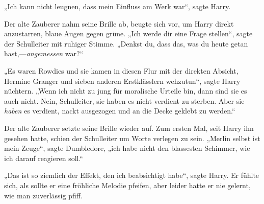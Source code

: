 „Ich kann nicht leugnen, dass mein Einfluss am Werk war“, sagte Harry.

Der alte Zauberer nahm seine Brille ab, beugte sich vor, um Harry direkt anzustarren, blaue Augen gegen grüne. „Ich werde dir eine Frage stellen“, sagte der Schulleiter mit ruhiger Stimme. „Denkst du, dass das, was du heute getan hast,—\emph{angemessen} war?“

„Es waren Rowdies und sie kamen in diesen Flur mit der direkten Absicht, Hermine Granger und sieben anderen Erstklässlern wehzutun“, sagte Harry nüchtern. „Wenn ich nicht zu jung für moralische Urteile bin, dann sind sie es auch nicht. Nein, Schulleiter, sie haben es nicht verdient zu sterben. Aber sie \emph{haben} es verdient, nackt ausgezogen und an die Decke geklebt zu werden.“

Der alte Zauberer setzte seine Brille wieder auf. Zum ersten Mal, seit Harry ihn gesehen hatte, schien der Schulleiter um Worte verlegen zu sein. „Merlin selbst ist mein Zeuge“, sagte Dumbledore, „ich habe nicht den blassesten Schimmer, wie ich darauf reagieren soll.“

„Das ist so ziemlich der Effekt, den ich beabsichtigt habe“, sagte Harry. Er fühlte sich, als sollte er eine fröhliche Melodie pfeifen, aber leider hatte er nie gelernt, wie man zuverlässig pfiff.

